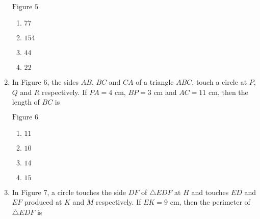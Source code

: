 \begin{enumerate}
\begin{figure}[ht]
\begin{tikzpicture}[scale = 1.4, rotate=10]
\end{tikzpicture}
\end{figure}
\begin{center}
$\text{Figure } 5$
\end{center}
\begin{enumerate}
\item $77$ 
\item $154$ 
\item $44$ 
\item $22$ 
\end{enumerate}
\item In Figure $6$, the sides $AB$, $BC$ and $CA$ of a triangle $ABC$, touch a circle at $P$, $Q$ and $R$ respectively. If $PA = 4\text{ cm}$, $BP = 3\text{ cm}$ and $AC = 11\text{ cm}$, then the length of $BC$  is
\begin{figure}[ht]
\centering
{}
\end{figure}
\begin{center}
$\text{Figure } 6$
\end{center}
\begin{enumerate}
\item $11$ 
\item $10$ 
\item $14$ 
\item $15$ 
\end{enumerate}
\item In Figure $7$, a circle touches the side $DF$ of $\triangle EDF$ at $H$ and touches $ED$ and $EF$ produced at $K$ and $M$ respectively. If $EK = 9\text{ cm}$, then the perimeter of $\triangle EDF$  is
\begin{figure}[ht]
\centering
\begin{tikzpicture}[scale=0.65]


\end{tikzpicture}
\end{figure}
\end{enumerate}
